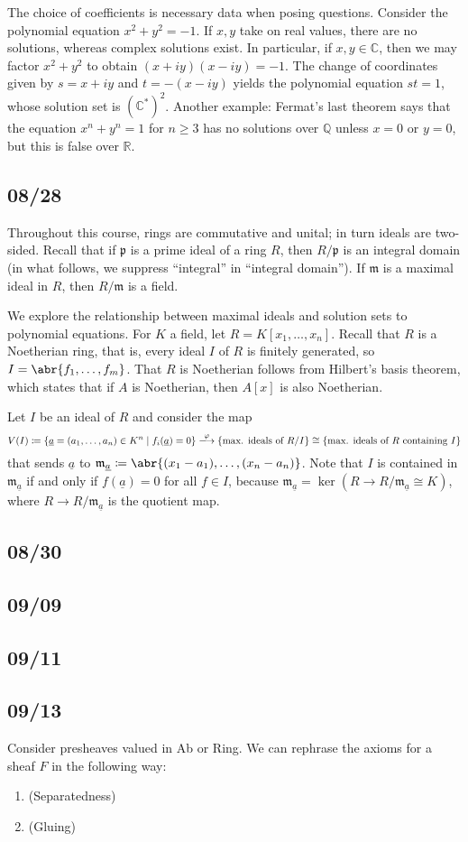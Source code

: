 \documentclass[11pt,leqno]{article}
\theoremstyle{plain}
\theoremstyle{definition}
\numberwithin{equation}{section}
\numberwithin{lem}{section}
\newcommand{\cbr}[1]{\left\{#1\right\}}
\begin{document}
The choice of coefficients is necessary data when posing questions. Consider the polynomial equation $x^2+y^2 = -1$. If $x,y$ take on real values, there are no solutions, whereas complex solutions exist.
In particular, if $x,y\in \mathbb C$, then we may factor $x^2 + y^2$ to obtain $(x+iy)(x-iy) = -1$. The change of coordinates given by $s = x+iy$ and $t = -(x-iy)$ yields the polynomial equation $st = 1$, whose solution set is $(\mathbb C^\ast)^2$.
Another example: Fermat's last theorem says that the equation $x^n + y^n = 1$ for $n\geq 3$ has no solutions over $\mathbb Q$ unless $x = 0$ or $y = 0$, but this is false over $\mathbb R$.

\newpage\subsection*{08/28}
Throughout this course, rings are commutative and unital; in turn ideals are two-sided.
Recall that if $\mathfrak p$ is a prime ideal of a ring $R$, then $R/\mathfrak p$ is an integral domain (in what follows, we suppress ``integral'' in ``integral domain'').
If $\mathfrak m$ is a maximal ideal in $R$, then $R/\mathfrak m$ is a field.

We explore the relationship between maximal ideals and solution sets to polynomial equations.
For $K$ a field, let $R = K[x_1,\dots,x_n]$. Recall that $R$ is a Noetherian ring, that is, every ideal $I$ of $R$ is finitely generated, so $I = \abr{f_1,\dots,f_m}$.
That $R$ is Noetherian follows from Hilbert's basis theorem, which states that if $A$ is Noetherian, then $A[x]$ is also Noetherian.

Let $I$ be an ideal of $R$ and consider the map
\begin{equation}
  V(I)\coloneqq\cbr{\underline a = (a_1,\dots,a_n)\in K^n \mid f_i(\underline a) = 0}\xlongrightarrow{\varphi}\cbr{\text{max. ideals of }R/I}\cong\cbr{\text{max. ideals of $R$ containing $I$}}
\end{equation}
that sends $\underline a$ to $\mathfrak m_{\underline a} \coloneqq \abr{(x_1-a_1),\dots,(x_n-a_n)}$. Note that $I$ is contained in $\mathfrak m_{\underline a}$ if and only if $f(\underline a) = 0$ for all $f\in I$, because $\mathfrak m_{\underline a} = \ker (R\to R/\mathfrak m_{\underline a}\cong K)$, where $R\to R/\mathfrak m_{\underline a}$ is the quotient map.


\newpage\subsection*{08/30}

\newpage\subsection*{09/09}

\newpage\subsection*{09/11}

\newpage\subsection*{09/13}
Consider presheaves valued in Ab or Ring. We can rephrase the axioms for a sheaf $F$ in the following way: 
\begin{enumerate}[label=(\arabic*)]
    \item (Separatedness)
    \item (Gluing)
\end{enumerate}
\end{document}
